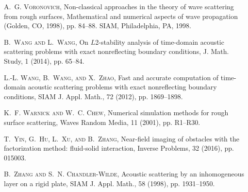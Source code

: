 \documentclass[final,leqno]{siamltex}
\begin{document}
\begin{thebibliography}{10}
\textsc{A.~G. Voronovich}, Non-classical approaches in the theory of wave
scattering from rough surfaces, Mathematical and numerical aspects of
wave propagation (Golden, CO, 1998), pp. 84--88. SIAM, Philadelphia, PA,
1998.

\textsc{B.~Wang and L.~Wang}, On $L$2-stability analysis of time-domain acoustic
scattering problems with exact nonreflecting boundary conditions, J. Math.
Study, 1 (2014), pp. 65--84.

\textsc{L.-L. Wang, B.~Wang, and X.~Zhao}, Fast and accurate computation of
time-domain acoustic scattering problems with exact nonreflecting boundary
conditions, SIAM J. Appl. Math., 72 (2012), pp. 1869--1898.

\textsc{K.~F. Warnick and W.~C. Chew}, Numerical simulation methods for rough
surface scattering, Waves Random Media, 11 (2001), pp. R1--R30.

\textsc{T.~Yin, G.~Hu, L.~Xu, and B.~Zhang}, Near-field imaging of obstacles
with the factorization method: fluid-solid interaction, Inverse Problems,
32 (2016), pp. 015003.

\textsc{B.~Zhang and S.~N. Chandler-Wilde}, Acoustic scattering by an
inhomogeneous layer on a rigid plate, SIAM J. Appl. Math., 58 (1998),
pp. 1931--1950.

\end{thebibliography}
\end{document}
